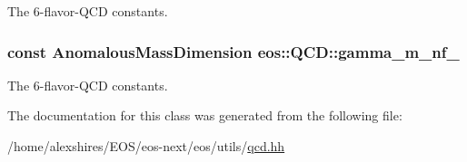 \label{classeos_1_1QCD_a2c39e24c316de9bceb7df4b6cce05665}
The 6-\/flavor-\/QCD constants. \hypertarget{classeos_1_1QCD_a121e70974f149e6303ec5cc0be5cec35}{
\subsubsection[{gamma\_\-m\_\-nf\_\-5}]{\setlength{\rightskip}{0pt plus 5cm}const {\bf AnomalousMassDimension} {\bf eos::QCD::gamma\_\-m\_\-nf\_}}}
\label{classeos_1_1QCD_a121e70974f149e6303ec5cc0be5cec35}
The 6-\/flavor-\/QCD constants. 

The documentation for this class was generated from the following file:\begin{DoxyCompactItemize}
\item 
/home/alexshires/EOS/eos-\/next/eos/utils/\hyperlink{qcd_8hh}{qcd.hh}\end{DoxyCompactItemize}
